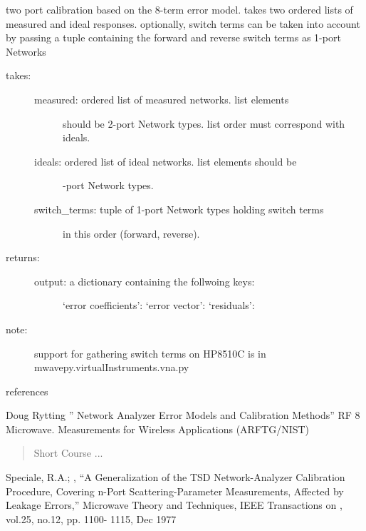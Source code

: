 \documentclass[letterpaper,10pt,english]{sphinxmanual}
\begin{document}
\begin{fulllineitems}
\label{api/mwavepy.calibration:mwavepy.calibration.calibrationAlgorithms.two_port}
two port calibration based on the 8-term error model.  takes two
ordered lists of measured and ideal responses. optionally, switch
terms can be taken into account by passing a tuple containing the
forward and reverse switch terms as 1-port Networks
\begin{description}
\item[{takes: }] \leavevmode\begin{description}
\item[{measured: ordered list of measured networks. list elements}] \leavevmode
should be       2-port  Network types. list order must correspond
with ideals.

\item[{ideals: ordered list of ideal networks. list elements should be}] -port  Network types.

\item[{switch\_terms: tuple of 1-port Network types holding switch terms}] \leavevmode
in this order (forward, reverse).

\end{description}

\item[{returns:}] \leavevmode\begin{description}
\item[{output: a dictionary containing the follwoing keys:}] \leavevmode
`error coefficients':
`error vector':
`residuals':

\end{description}

\item[{note:}] \leavevmode
support for gathering switch terms on HP8510C  is in
mwavepy.virtualInstruments.vna.py

\end{description}

references

Doug Rytting '' Network Analyzer Error Models and Calibration Methods''
RF 8 Microwave. Measurements for Wireless Applications (ARFTG/NIST)
\begin{quote}

Short Course ...
\end{quote}

Speciale, R.A.; , ``A Generalization of the TSD Network-Analyzer
Calibration Procedure, Covering n-Port Scattering-Parameter
Measurements, Affected by Leakage Errors,'' Microwave Theory and
Techniques, IEEE Transactions on , vol.25, no.12, pp. 1100- 1115,
Dec 1977

\end{fulllineitems}
\end{document}
